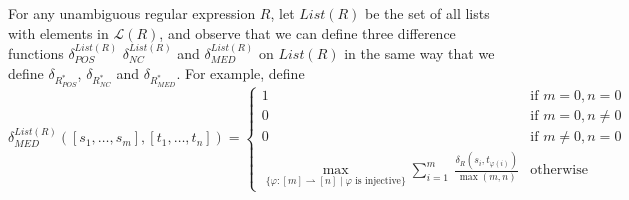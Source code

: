 \documentclass[acmsmall,review,anonymous]{acmart}\settopmatter{printfolios=true,printccs=false,printacmref=false}
\theoremstyle{definition}
\begin{document}
For any unambiguous regular expression $R$, let $List(R)$ be the set of all lists with elements in $\mathcal{L}(R)$, and observe that we can define three difference functions $\delta^{List(R)}_{POS}$ $\delta^{List(R)}_{NC}$ and $\delta^{List(R)}_{MED}$ on $List(R)$ in the same way that we define $\delta_{R^*_{POS}}$, $\delta_{R^*_{NC}}$ and $\delta_{R^*_{MED}}$. For example, define
$$
\delta^{List(R)}_{MED}([s_1, \ldots, s_m], [t_1, \ldots, t_n]) = 
\begin{cases}
1 & \text{if } m = 0, n = 0\\ 
0 & \text{if } m = 0, n \neq 0\\
0 & \text{if } m \neq 0, n = 0\\\max\limits_{\{\varphi : [m] \rightharpoonup [n] \; | \; \varphi \text{ is injective}\}}\sum\limits_{i=1}^{m}\ \frac{\delta_R(s_i, t_{\varphi(i)})}{\max(m,n)}& \text{otherwise}
\end{cases}
$$
\end{document}
